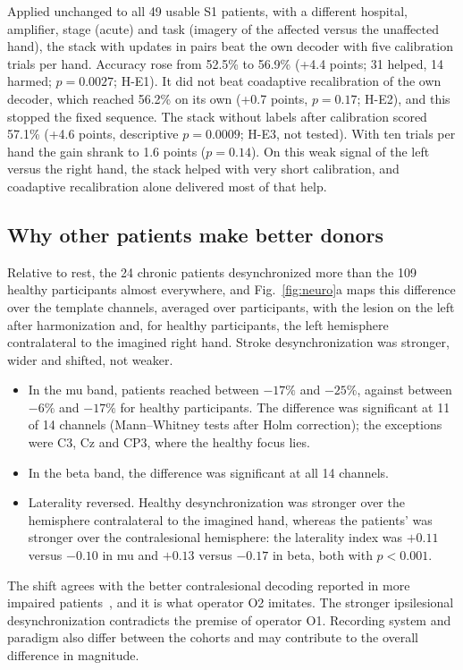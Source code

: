 \documentclass{ieeeaccess}
\begin{document}
Applied unchanged to all 49 usable S1 patients, with a different hospital, amplifier, stage (acute) and task (imagery of the affected versus the unaffected hand), the stack with updates in pairs beat the own decoder with five calibration trials per hand. Accuracy rose from 52.5\% to 56.9\% (+4.4 points; 31 helped, 14 harmed; $p = 0.0027$; H-E1). It did not beat coadaptive recalibration of the own decoder, which reached 56.2\% on its own (+0.7 points, $p = 0.17$; H-E2), and this stopped the fixed sequence. The stack without labels after calibration scored 57.1\% (+4.6 points, descriptive $p = 0.0009$; H-E3, not tested). With ten trials per hand the gain shrank to 1.6 points ($p = 0.14$). On this weak signal of the left versus the right hand, the stack helped with very short calibration, and coadaptive recalibration alone delivered most of that help.

\subsection{Why other patients make better donors}\label{sec:res-neuro}

Relative to rest, the 24 chronic patients desynchronized more than the 109 healthy participants almost everywhere, and Fig.~\ref{fig:neuro}a maps this difference over the template channels, averaged over participants, with the lesion on the left after harmonization and, for healthy participants, the left hemisphere contralateral to the imagined right hand. Stroke desynchronization was stronger, wider and shifted, not weaker.
\begin{itemize}
\item In the mu band, patients reached between $-17\%$ and $-25\%$, against between $-6\%$ and $-17\%$ for healthy participants. The difference was significant at 11 of 14 channels (Mann--Whitney tests after Holm correction); the exceptions were C3, Cz and CP3, where the healthy focus lies.
\item In the beta band, the difference was significant at all 14 channels.
\item Laterality reversed. Healthy desynchronization was stronger over the hemisphere contralateral to the imagined hand, whereas the patients' was stronger over the contralesional hemisphere: the laterality index was $+0.11$ versus $-0.10$ in mu and $+0.13$ versus $-0.17$ in beta, both with $p < 0.001$.
\end{itemize}
The shift agrees with the better contralesional decoding reported in more impaired patients~\cite{mansour2022}, and it is what operator O2 imitates. The stronger ipsilesional desynchronization contradicts the premise of operator O1. Recording system and paradigm also differ between the cohorts and may contribute to the overall difference in magnitude.
\end{document}
